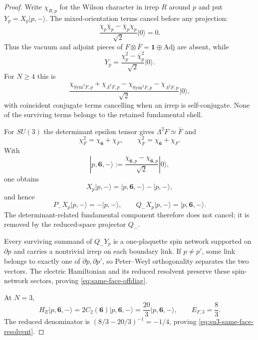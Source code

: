 \documentclass[11pt]{article}
\theoremstyle{plain}
\theoremstyle{definition}
\theoremstyle{remark}
\begin{document}
\begin{proof}
Write $\chi_{R,p}$ for the Wilson character in irrep $R$ around $p$ and put
$Y_p=X_p|p,-\rangle$.  The mixed-orientation terms cancel before any
projection:
\[
 \frac{\chi_p\bar\chi_p-\bar\chi_p\chi_p}{\sqrt2}|0\rangle=0 .
\]
Thus the vacuum and adjoint pieces of
$F\otimes\bar F=\mathbf1\oplus\mathrm{Adj}$ are absent, while
\[
 Y_p=\frac{\chi_p^2-\bar\chi_p^2}{\sqrt2}|0\rangle .
\]
For $N\ge4$ this is
\[
 \frac{\chi_{\mathrm{Sym}^2F,p}+\chi_{\Lambda^2F,p}
 -\chi_{\overline{\mathrm{Sym}^2F},p}
 -\chi_{\overline{\Lambda^2F},p}}{\sqrt2}|0\rangle,
\]
with coincident conjugate terms cancelling when an irrep is self-conjugate.
None of the surviving terms belongs to the retained fundamental shell.

For $SU(3)$ the determinant epsilon tensor gives
$\Lambda^2F\simeq\bar F$ and
\[
 \chi_F^2=\chi_{\mathbf6}+\chi_{\bar F},
 \qquad
 \chi_{\bar F}^2=\chi_{\bar{\mathbf6}}+\chi_F .
\]
With
\[
 |p,\mathbf6,-\rangle
 :=\frac{\chi_{\mathbf6,p}-\chi_{\bar{\mathbf6},p}}{\sqrt2}|0\rangle,
\]
one obtains
\begin{equation}\label{eq:su3-same-face}
 X_p|p,-\rangle=|p,\mathbf6,-\rangle-|p,-\rangle,
\end{equation}
and hence
\begin{equation}\label{eq:su3-same-face-Q}
 P_-X_p|p,-\rangle=-|p,-\rangle,
 \qquad
 Q_-X_p|p,-\rangle=|p,\mathbf6,-\rangle .
\end{equation}
The determinant-related fundamental component therefore does not cancel; it
is removed by the reduced-space projector $Q_-$.

Every surviving summand of $Q_-Y_p$ is a one-plaquette spin network supported
on $\partial p$ and carries a nontrivial irrep on each boundary link.  If
$p\ne p'$, some link belongs to exactly one of $\partial p,\partial p'$, so
Peter--Weyl orthogonality separates the two vectors.  The electric Hamiltonian
and its reduced resolvent preserve these spin-network sectors, proving
\eqref{eq:same-face-offdiag}.

At $N=3$,
\[
 H_E|p,\mathbf6,-\rangle
 =2C_2(\mathbf6)|p,\mathbf6,-\rangle
 =\frac{20}{3}|p,\mathbf6,-\rangle,
 \qquad E_{F,3}=\frac83 .
\]
The reduced denominator is $(8/3-20/3)^{-1}=-1/4$, proving
\eqref{eq:su3-same-face-resolvent}.
\end{proof}
\end{document}
